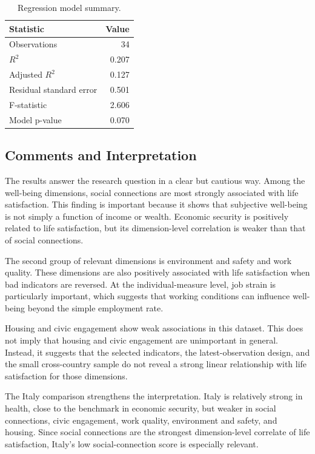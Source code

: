 \documentclass[11pt,a4paper]{article}
\begin{document}
\begin{table}[H]
\centering
\caption{Regression model summary.}
\label{tab:regsummary}
\begin{tabular}{lr}
\toprule
Statistic & Value \\
\midrule
Observations & 34 \\
$R^2$ & 0.207 \\
Adjusted $R^2$ & 0.127 \\
Residual standard error & 0.501 \\
F-statistic & 2.606 \\
Model p-value & 0.070 \\
\bottomrule
\end{tabular}
\end{table}

\subsection{Comments and Interpretation}

The results answer the research question in a clear but cautious way. Among the well-being dimensions, social connections are most strongly associated with life satisfaction. This finding is important because it shows that subjective well-being is not simply a function of income or wealth. Economic security is positively related to life satisfaction, but its dimension-level correlation is weaker than that of social connections.

The second group of relevant dimensions is environment and safety and work quality. These dimensions are also positively associated with life satisfaction when bad indicators are reversed. At the individual-measure level, job strain is particularly important, which suggests that working conditions can influence well-being beyond the simple employment rate.

Housing and civic engagement show weak associations in this dataset. This does not imply that housing and civic engagement are unimportant in general. Instead, it suggests that the selected indicators, the latest-observation design, and the small cross-country sample do not reveal a strong linear relationship with life satisfaction for those dimensions.

The Italy comparison strengthens the interpretation. Italy is relatively strong in health, close to the benchmark in economic security, but weaker in social connections, civic engagement, work quality, environment and safety, and housing. Since social connections are the strongest dimension-level correlate of life satisfaction, Italy's low social-connection score is especially relevant.
\end{document}
